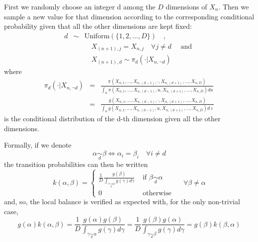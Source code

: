 First we randomly choose an integer d among the $D$ dimensions of $X_n$. Then we sample a new value for that dimension according to the corresponding conditional probability given that all the other dimensions are kept fixed:
\begin{eqnarray}
d 
&\sim& \text {Uniform}(\{1,2, \ldots, D\}) \quad, \nonumber \\
&&\quad X_{(n+1), j}=X_{n, j} \quad \forall j \neq d \quad \text { and } \nonumber \\
&&\quad X_{(n+1), d} \sim \pi_{d}\left(\cdot | X_{n, \neg d}\right)\nonumber
\end{eqnarray}
where
\begin{eqnarray}
\pi_{d}\left(\cdot | X_{n, \neg d}\right)
&=&\frac{\pi\left(X_{n, 1}, \ldots, X_{n,(d-1)}, \cdot, X_{n,(d+1)}, \ldots, X_{n, D}\right)}{\int_{u} \pi\left(X_{n, 1}, \ldots, X_{n,(d-1)}, u, X_{n,(d+1)}, \ldots, X_{n, D}\right) d u}\nonumber \\
&=&\frac{g\left(X_{n, 1}, \dots, X_{n,(d-1)}, \cdot, X_{n,(d+1)}, \dots, X_{n, D}\right)}{\int_{u} g\left(X_{n, 1}, \dots, X_{n,(d-1)}, u, X_{n,(d+1)}, \dots, X_{n, D}\right) d \imath}\nonumber
\end{eqnarray}
is the conditional distribution of the d-th dimension given all the other dimensions.

Formally, if we denote
\begin{equation}
\alpha \underset{d}{\sim}{\beta} \Longleftrightarrow 
\alpha_{i}=\beta_{i} 
\quad \forall i \neq d
\end{equation}
the transition probabilities can then be written
\begin{equation}k(\alpha, \beta)=\left\{\begin{array}{ll}
\frac{1}{D} \frac{g(\beta)}{\int_{\gamma \underset{d}{\sim}\alpha} g(\gamma) d \gamma} & \text { if } \beta \underset{d}{\sim} \alpha \\
0 & \text { otherwise }
\end{array} \quad \forall \beta \neq \alpha\right.\end{equation}
and, so, the local balance is verified as expected with, for the only non-trivial case,
\begin{equation}g(\alpha) k(\alpha, \beta)
=\frac{1}{D} \frac{g(\alpha) g(\beta)}{\int_{\gamma \underset{d}{\sim}\alpha} g(\gamma) d \gamma}
=\frac{1}{D} \frac{g(\beta) g(\alpha)}{\int_{\gamma \underset{d}{\sim}\beta} g(\gamma) d \gamma}=g(\beta) k(\beta, \alpha)\end{equation}

